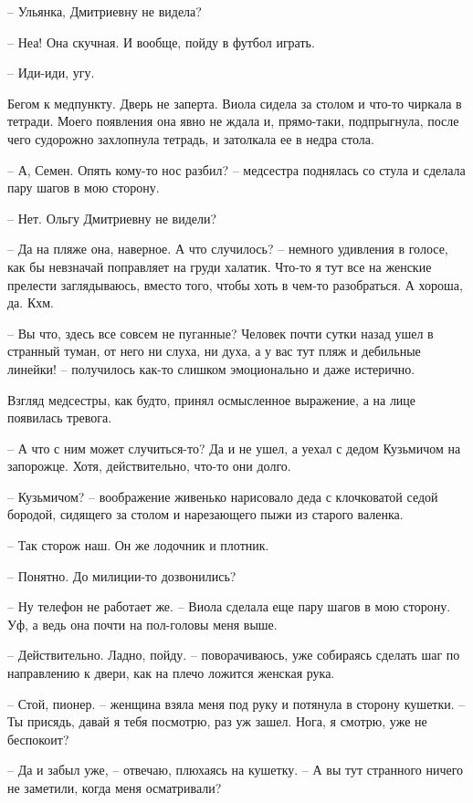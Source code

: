\documentclass[a4paper]{book}
\begin{document}
-- Ульянка, Дмитриевну не видела? 

-- Неа! Она скучная. И вообще, пойду в футбол играть.

-- Иди-иди, угу.

Бегом к медпункту. Дверь не заперта. Виола сидела за столом и что-то чиркала в тетради. Моего появления она явно не ждала и, прямо-таки, подпрыгнула, после чего судорожно захлопнула тетрадь, и затолкала ее в недра стола.

-- А, Семен. Опять кому-то нос разбил? -- медсестра поднялась со стула и сделала пару шагов в мою сторону.

-- Нет. Ольгу Дмитриевну не видели?

-- Да на пляже она, наверное. А что случилось? -- немного удивления в голосе, как бы невзначай поправляет на груди халатик. Что-то я тут все на женские прелести заглядываюсь, вместо того, чтобы хоть в чем-то разобраться. А хороша, да. Кхм.

-- Вы что, здесь все совсем не пуганные? Человек почти сутки назад ушел в странный туман, от него ни слуха, ни духа, а у вас тут пляж и дебильные линейки! -- получилось как-то слишком эмоционально и даже истерично. 

Взгляд медсестры, как будто, принял осмысленное выражение, а на лице появилась тревога. 

-- А что с ним может случиться-то? Да и не ушел, а уехал с дедом Кузьмичом на запорожце. Хотя, действительно, что-то они долго. 

-- Кузьмичом? -- воображение живенько нарисовало деда с клочковатой седой бородой, сидящего за столом и нарезающего пыжи из старого валенка.

-- Так сторож наш. Он же лодочник и плотник. 

-- Понятно. До милиции-то дозвонились?

-- Ну телефон не работает же. -- Виола сделала еще пару шагов в мою сторону. Уф, а ведь она почти на пол-головы меня выше. 

-- Действительно. Ладно, пойду. -- поворачиваюсь, уже собираясь сделать шаг по направлению к двери, как на плечо ложится женская рука.

-- Стой, пионер. -- женщина взяла меня под руку и потянула в сторону кушетки. -- Ты присядь, давай я тебя посмотрю, раз уж зашел. Нога, я смотрю, уже не беспокоит?

-- Да и забыл уже, -- отвечаю, плюхаясь на кушетку. -- А вы тут странного ничего не заметили, когда меня осматривали?
\end{document}
